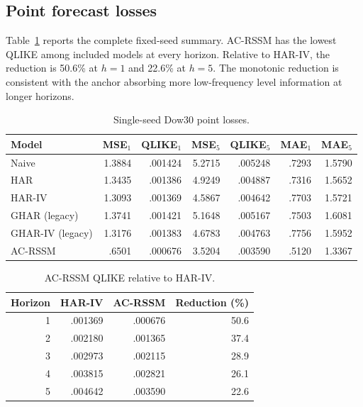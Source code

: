 \documentclass[11pt]{article}
\begin{document}
\subsection{Point forecast losses}
Table~\ref{tab:loss} reports the complete fixed-seed summary. AC-RSSM has the lowest QLIKE among included models at every horizon. Relative to HAR-IV, the reduction is 50.6\% at $h=1$ and 22.6\% at $h=5$. The monotonic reduction is consistent with the anchor absorbing more low-frequency level information at longer horizons.
\begin{table}[h]\centering\caption{Single-seed Dow30 point losses.}\label{tab:loss}\small\begin{tabular}{lrrrrrr}\toprule Model & MSE$_1$ & QLIKE$_1$ & MSE$_5$ & QLIKE$_5$ & MAE$_1$ & MAE$_5$\\\midrule Naive & 1.3884 & .001424 & 5.2715 & .005248 & .7293 & 1.5790\\ HAR & 1.3435 & .001386 & 4.9249 & .004887 & .7316 & 1.5652\\ HAR-IV & 1.3093 & .001369 & 4.5867 & .004642 & .7703 & 1.5721\\ GHAR (legacy) & 1.3741 & .001421 & 5.1648 & .005167 & .7503 & 1.6081\\ GHAR-IV (legacy) & 1.3176 & .001383 & 4.6783 & .004763 & .7756 & 1.5952\\ AC-RSSM & .6501 & .000676 & 3.5204 & .003590 & .5120 & 1.3367\\\bottomrule\end{tabular}\end{table}

\begin{table}[h]\centering\caption{AC-RSSM QLIKE relative to HAR-IV.}\begin{tabular}{rrrr}\toprule Horizon & HAR-IV & AC-RSSM & Reduction (\%)\\\midrule 1 & .001369 & .000676 & 50.6\\ 2 & .002180 & .001365 & 37.4\\ 3 & .002973 & .002115 & 28.9\\ 4 & .003815 & .002821 & 26.1\\ 5 & .004642 & .003590 & 22.6\\\bottomrule\end{tabular}\end{table}
\end{document}
